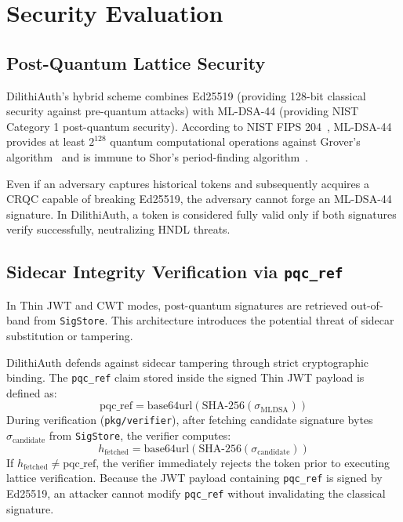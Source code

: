 \documentclass[conference]{IEEEtran}
\begin{document}
\section{Security Evaluation}

\subsection{Post-Quantum Lattice Security}
DilithiAuth's hybrid scheme combines Ed25519 (providing 128-bit classical security against pre-quantum attacks) with ML-DSA-44 (providing NIST Category 1 post-quantum security). According to NIST FIPS 204~\cite{fips204}, ML-DSA-44 provides at least $2^{128}$ quantum computational operations against Grover's algorithm~\cite{grover1996} and is immune to Shor's period-finding algorithm~\cite{shor1994}.

Even if an adversary captures historical tokens and subsequently acquires a CRQC capable of breaking Ed25519, the adversary cannot forge an ML-DSA-44 signature. In DilithiAuth, a token is considered fully valid only if both signatures verify successfully, neutralizing HNDL threats.

\subsection{Sidecar Integrity Verification via \texttt{pqc\_ref}}
In Thin JWT and CWT modes, post-quantum signatures are retrieved out-of-band from \texttt{SigStore}. This architecture introduces the potential threat of sidecar substitution or tampering.

DilithiAuth defends against sidecar tampering through strict cryptographic binding. The \texttt{pqc\_ref} claim stored inside the signed Thin JWT payload is defined as:
\begin{equation}
\text{pqc\_ref} = \text{base64url}(\text{SHA-256}(\sigma_{\text{MLDSA}}))
\end{equation}
During verification (\texttt{pkg/verifier}), after fetching candidate signature bytes $\sigma_{\text{candidate}}$ from \texttt{SigStore}, the verifier computes:
\begin{equation}
h_{\text{fetched}} = \text{base64url}(\text{SHA-256}(\sigma_{\text{candidate}}))
\end{equation}
If $h_{\text{fetched}} \neq \text{pqc\_ref}$, the verifier immediately rejects the token prior to executing lattice verification. Because the JWT payload containing \texttt{pqc\_ref} is signed by Ed25519, an attacker cannot modify \texttt{pqc\_ref} without invalidating the classical signature.
\end{document}
